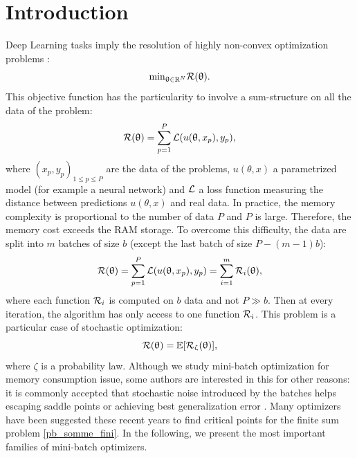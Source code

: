 \documentclass[article,authoryear,jmlmc]{beg_32}             %
\begin{document}

\maketitle

\section{Introduction}
\label{intro}

Deep Learning tasks 
\cite{image_recognition,language_recognition,plasma} 
imply the resolution of highly non-convex optimization problems \cite{DL_opti}:
\begin{equation*}
\displaystyle{\textrm{min}_{\uptheta\in \mathbb{R}^N}} \mathcal{R}(\uptheta).
\end{equation*}
This objective function has the particularity to involve a sum-structure on all the data of the problem:
\begin{equation*}
	\mathcal{R}(\uptheta) = \displaystyle{\sum_{p=1}^{P} \mathcal{L}(u(\uptheta,x_p), y_p)},
\end{equation*}
where $(x_p,y_p)_{1\leq p \leq P}$ are the data of the problems, $u(\theta,x)$ a parametrized model (for example a neural network) and $\mathcal{L}$ a loss function measuring the distance between predictions $u(\theta,x)$ and real data. In practice, the memory complexity is proportional to the number of data $P$ and $P$ is large. Therefore, the memory cost exceeds the RAM storage. To overcome this difficulty, the data are split into $m$ batches of size $b$ (except the last batch of size $P-(m-1)b$):
\begin{equation}
	\mathcal{R}(\uptheta) = \displaystyle{\sum_{p=1}^{P} \mathcal{L}(u(\uptheta,x_p), y_p)} = \sum_{i=1}^m \mathcal{R}_i(\uptheta),
	\label{pb_somme_fini}
\end{equation}
where each function $\mathcal{R}_i$ is computed on $b$ data and not $P \gg b$. Then at every iteration, the algorithm has only access to one function $\mathcal{R}_i$. This problem is a particular case of stochastic optimization:
\begin{equation}
	\R(\theta) = \mean \left[\R_{\zeta}(\theta)\right],
	\label{opti_sto}
\end{equation}  
where $\zeta$ is a probability law. Although we study mini-batch optimization for memory consumption issue, some authors are interested in this for other reasons: it is commonly
accepted that stochastic noise introduced by the batches helps escaping saddle points \cite{sgd_escape1,sgd_escape2,sgd_escape3,sgd_escape4} or achieving best generalization error
\cite{sgd_gen1,sgd_gen2,sgd_gen3,sgd_gen4}. Many optimizers have been suggested these recent years to find critical points for the finite sum problem \eqref{pb_somme_fini}. In the
following, we present the most important families of mini-batch optimizers.
\end{document}
